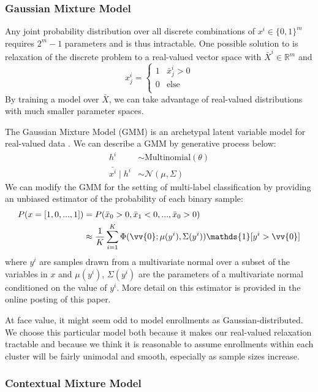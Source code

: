 \documentclass{edm_template}
\begin{document}
\subsubsection{Gaussian Mixture Model}
\label{section:gmm}

Any joint probability distribution over all discrete combinations of $x^i \in \{0,1\}^m$ requires $2^m - 1$ parameters and is thus intractable. One possible solution to is relaxation of the discrete problem to a real-valued vector space with $\bar{X}^i \in \mathbb{R}^m$ and 
$$x^i_j =
\begin{cases} 
1 & \bar{x}^i_{j} > 0 \\
0 & \text{else} \\
\end{cases}$$
By training a model over $\bar{X}$, we can take advantage of real-valued distributions with much smaller parameter spaces. 

The Gaussian Mixture Model (GMM) is an archetypal latent variable model for real-valued data \cite{reynolds2015gaussian}. We can describe a GMM by generative process below:
\begin{align*}
h^i &\sim \text{Multinomial}(\theta) \\
\bar{x^i} \mid h^i &\sim \mathcal{N}(\mu, \Sigma) 
\end{align*}
We can modify the GMM for the setting of multi-label classification by providing an unbiased estimator of the probability of each binary sample:
\begin{align*}
P(x = [1, 0, ..., 1]) 
&= P(\bar{x}_0 > 0, \bar{x}_1 < 0, ..., \bar{x}_0 > 0) \\
&\approx \frac{1}{K} \sum_{i = 1}^{K} \Phi(\vv{0}; \mu(y^i), \Sigma(y^i)) \mathds{1}[y^i > \vv{0}] 
\end{align*}
where $y^i$ are samples drawn from a multivariate normal over a subset of the variables in $x$ and $\mu(y^i)$, $\Sigma(y^i)$ are the parameters of a  multivariate normal conditioned on the value of $y^i$. More detail on this estimator is provided in the online posting of this paper.

At face value, it might seem odd to model enrollments as Gaussian-distributed. We choose this particular model both because it makes our real-valued relaxation tractable and because we think it is reasonable to assume enrollments within each cluster will be fairly unimodal and smooth, especially as sample sizes increase.

\subsubsection{Contextual Mixture Model}
\label{section:cmm}
\end{document}
